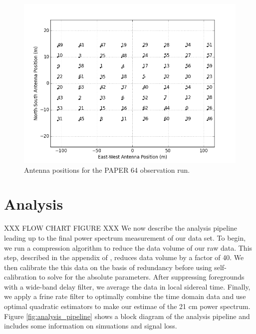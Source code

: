\documentclass[twocolumn,numberedappendix]{emulateapj}
\begin{document}
\begin{figure}[!t]\centering
\includegraphics[width=1.85\columnwidth,height=\columnwidth]{plots/antenna_positions.png}
\caption{Antenna positions for the PAPER 64 observation run.}
\label{fig:antenna_positions}
\end{figure}


\section{Analysis}
XXX FLOW CHART FIGURE XXX
We now describe the analysis pipeline leading up to the final power spectrum
measurement of our data set. To begin, we run a compression algorithm to reduce
the data volume of our raw data. This step, described in the appendix of
\cite{parsons_et_al2014a}, reduces data volume by a factor of 40. We then
calibrate the this data on the basis of redundancy before using self-calibration
to solve for the absolute parameters. After suppressing foregrounds with a
wide-band delay filter, we average the data in local sidereal time. Finally, we
apply a frine rate filter to optimally combine the time domain data and use
optimal quadratic estimators to make our estimae of the 21 cm power spectrum.
Figure \ref{fig:analysis_pipeline} shows a block diagram of the analysis
pipeline and includes some information on simuations and signal loss.
\end{document}
